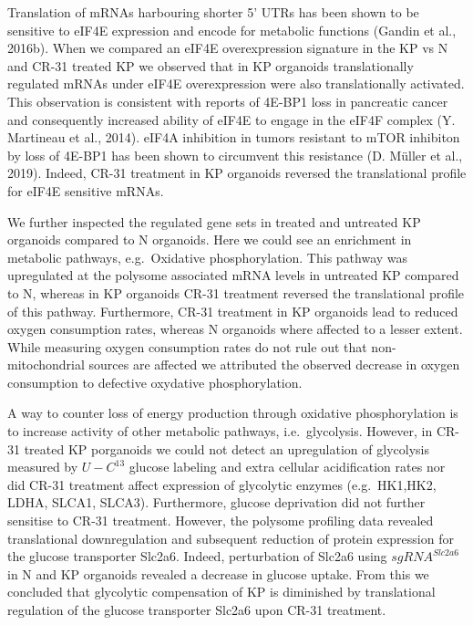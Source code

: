 \documentclass[12pt,openany]{book}
\begin{document}
Translation of mRNAs harbouring shorter 5' UTRs has been shown to be
sensitive to eIF4E expression and encode for metabolic functions (Gandin
et al., 2016b). When we compared an eIF4E overexpression signature in
the KP vs N and CR-31 treated KP we observed that in KP organoids
translationally regulated mRNAs under eIF4E overexpression were also
translationally activated. This observation is consistent with reports
of 4E-BP1 loss in pancreatic cancer and consequently increased ability
of eIF4E to engage in the eIF4F complex (Y. Martineau et al., 2014).
eIF4A inhibition in tumors resistant to mTOR inhibiton by loss of 4E-BP1
has been shown to circumvent this resistance (D. Müller et al., 2019).
Indeed, CR-31 treatment in KP organoids reversed the translational
profile for eIF4E sensitive mRNAs.

We further inspected the regulated gene sets in treated and untreated KP
organoids compared to N organoids. Here we could see an enrichment in
metabolic pathways, e.g.~Oxidative phosphorylation. This pathway was
upregulated at the polysome associated mRNA levels in untreated KP
compared to N, whereas in KP organoids CR-31 treatment reversed the
translational profile of this pathway. Furthermore, CR-31 treatment in
KP organoids lead to reduced oxygen consumption rates, whereas N
organoids where affected to a lesser extent. While measuring oxygen
consumption rates do not rule out that non-mitochondrial sources are
affected we attributed the observed decrease in oxygen consumption to
defective oxydative phosphorylation.

A way to counter loss of energy production through oxidative
phosphorylation is to increase activity of other metabolic pathways,
i.e.~glycolysis. However, in CR-31 treated KP porganoids we could not
detect an upregulation of glycolysis measured by \(U-C^{13}\) glucose
labeling and extra cellular acidification rates nor did CR-31 treatment
affect expression of glycolytic enzymes (e.g.~HK1,HK2, LDHA, SLCA1,
SLCA3). Furthermore, glucose deprivation did not further sensitise to
CR-31 treatment. However, the polysome profiling data revealed
translational downregulation and subsequent reduction of protein
expression for the glucose transporter Slc2a6. Indeed, perturbation of
Slc2a6 using \(sgRNA^{Slc2a6}\) in N and KP organoids revealed a
decrease in glucose uptake. From this we concluded that glycolytic
compensation of KP is diminished by translational regulation of the
glucose transporter Slc2a6 upon CR-31 treatment.
\end{document}

